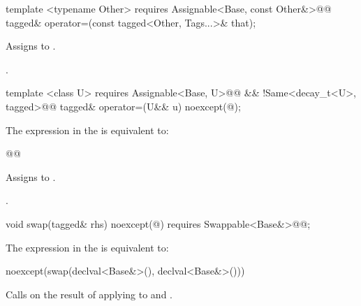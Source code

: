 {
\begin{itemdecl}
template <typename Other>
  requires Assignable<Base, const Other&>@\newtxt{()}@
tagged& operator=(const tagged<Other, Tags...>& that);
\end{itemdecl}

\begin{itemdescr}
\pnum
\effects Assigns  to .

\pnum
\returns {}.
\end{itemdescr}

\begin{itemdecl}
template <class U>
  requires Assignable<Base, U>@\newtxt{()}@ && !Same<decay_t<U>, tagged>@\newtxt{()}@
tagged& operator=(U&& u) noexcept(@\seebelow@);
\end{itemdecl}

\begin{itemdescr}
\pnum
\remarks The expression in the  is equivalent to:

\begin{codeblock}
@@
\end{codeblock}

\pnum
\effects Assigns  to .

\pnum
\returns {}.
\end{itemdescr}

\begin{itemdecl}
void swap(tagged& rhs) noexcept(@\seebelow@)
  requires Swappable<Base&>@\newtxt{()}@;
\end{itemdecl}

\begin{itemdescr}
\pnum
\remarks The expression in the  is equivalent to:

\begin{codeblock}
noexcept(swap(declval<Base&>(), declval<Base&>()))
\end{codeblock}

\pnum
\effects Calls  on the result of applying  to  and
.


\end{itemdescr}}
